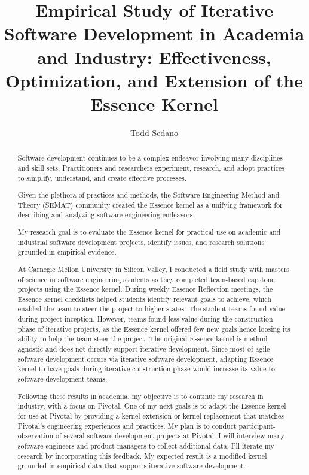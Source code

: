 \documentclass[preprint,12pt,3p]{elsarticle}
\begin{document}
\begin{frontmatter}

\title{Empirical Study of Iterative Software Development in Academia and Industry: Effectiveness, Optimization, and Extension of the Essence Kernel}

\author{Todd Sedano}


\address{Carnegie Mellon University}
\address{Silicon Valley Campus}
\address{Moffett Field, CA 94035, USA}


\begin{abstract}
Software development continues to be a complex endeavor involving many disciplines and skill sets. Practitioners and researchers experiment, research, and adopt practices to simplify, understand, and create effective processes. 

Given the plethora of practices and methods, the Software Engineering Method and Theory (SEMAT) community created the Essence kernel as a unifying framework for describing and analyzing software engineering endeavors. 

My research goal is to evaluate the Essence kernel for practical use on academic and industrial software development projects, identify issues, and research solutions grounded in empirical evidence. 

At Carnegie Mellon University in Silicon Valley, I conducted a field study with masters of science in software engineering students as they completed team-based capstone projects using the Essence kernel. During weekly Essence Reflection meetings, the Essence kernel checklists helped students identify relevant goals to achieve, which enabled the team to steer the project to higher states. The student teams found value during project inception. However, teams found less value during the construction phase of iterative projects, as the Essence kernel offered few new goals hence loosing its ability to help the team steer the project. The original Essence kernel is method agnostic and does not directly support iterative development. Since most of agile software development occurs via iterative software development, adapting Essence kernel to have goals during iterative construction phase would increase its value to software development teams.

Following these results in academia, my objective is to continue my research in industry, with a focus on Pivotal. One of my next goals is to adapt the Essence kernel for use at Pivotal by providing a kernel extension or kernel replacement that matches Pivotal's engineering experiences and practices. My plan is to conduct participant-observation of several software development projects at Pivotal. I will interview many software engineers and product managers to collect additional data. I'll iterate my research by incorporating this feedback. My expected result is a modified kernel grounded in empirical data that supports iterative software development. 


\end{abstract}
\end{frontmatter}
\end{document}
